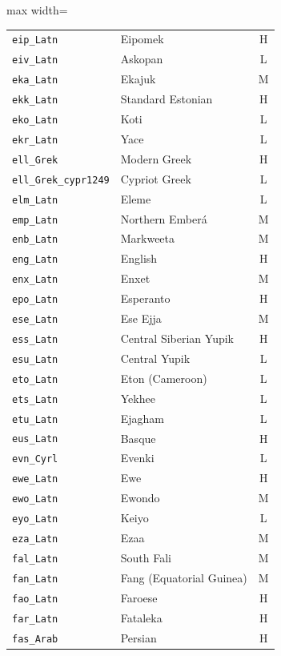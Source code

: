 {\begin{adjustbox}{max width=\textwidth}
\begin{tabular}{llc}
        \texttt{eip\_Latn} & Eipomek & H \\
        \texttt{eiv\_Latn} & Askopan & L \\
        \texttt{eka\_Latn} & Ekajuk & M \\
        \texttt{ekk\_Latn} & Standard Estonian & H \\
        \texttt{eko\_Latn} & Koti & L \\
        \texttt{ekr\_Latn} & Yace & L \\
        \texttt{ell\_Grek} & Modern Greek & H \\
        \texttt{ell\_Grek\_cypr1249} & Cypriot Greek & L \\
        \texttt{elm\_Latn} & Eleme & L \\
        \texttt{emp\_Latn} & Northern Emberá & M \\
        \texttt{enb\_Latn} & Markweeta & M \\
        \texttt{eng\_Latn} & English & H \\
        \texttt{enx\_Latn} & Enxet & M \\
        \texttt{epo\_Latn} & Esperanto & H \\
        \texttt{ese\_Latn} & Ese Ejja & M \\
        \texttt{ess\_Latn} & Central Siberian Yupik & H \\
        \texttt{esu\_Latn} & Central Yupik & L \\
        \texttt{eto\_Latn} & Eton (Cameroon) & L \\
        \texttt{ets\_Latn} & Yekhee & L \\
        \texttt{etu\_Latn} & Ejagham & L \\
        \texttt{eus\_Latn} & Basque & H \\
        \texttt{evn\_Cyrl} & Evenki & L \\
        \texttt{ewe\_Latn} & Ewe & H \\
        \texttt{ewo\_Latn} & Ewondo & M \\
        \texttt{eyo\_Latn} & Keiyo & L \\
        \texttt{eza\_Latn} & Ezaa & M \\
        \texttt{fal\_Latn} & South Fali & M \\
        \texttt{fan\_Latn} & Fang (Equatorial Guinea) & M \\
        \texttt{fao\_Latn} & Faroese & H \\
        \texttt{far\_Latn} & Fataleka & H \\
        \texttt{fas\_Arab} & Persian & H \\

\end{tabular}
\end{adjustbox}}
